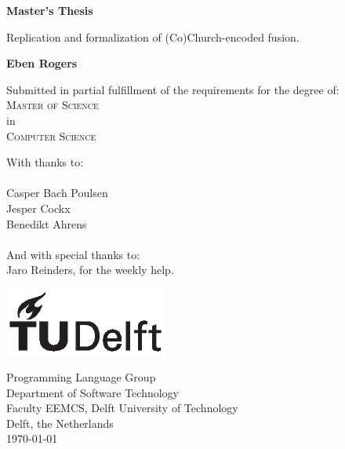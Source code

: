 \newcommand{\thetitle}{Master's Thesis}
\newcommand{\thesubtitle}{Replication and formalization of (Co)Church-encoded fusion.}
\newcommand{\thename}{Eben Rogers}
\begin{titlepage}
    \begin{center}
        \vspace*{1cm}
            
        \Huge
        \textbf{\thetitle}
        \vspace{0.5cm}
        \LARGE

        \thesubtitle
            
        \vspace{1.5cm}
        \textbf{\thename}

        \vspace{0.8cm}
            
        \large
        Submitted in partial fulfillment of the requirements for the degree of:\\
        \LARGE
        \textsc{Master of Science}\\
        \Large
        in\\
        \LARGE
        \textsc{Computer Science}\\

        \vspace{0.8cm}

        \large
        With thanks to:\\~\\
        Casper Bach Poulsen \\
        Jesper Cockx\\
        Benedikt Ahrens\\~\\
        And with special thanks to:\\
        Jaro Reinders, for the weekly help.
        
        \vfill
        \includegraphics[width=0.4\textwidth]{figures/tudelft_logo_bw}
            
        \Large
        Programming Language Group \\
        Department of Software Technology \\
        Faculty EEMCS, Delft University of Technology \\
        Delft, the Netherlands \\
        \today
            
    \end{center}
\end{titlepage}
